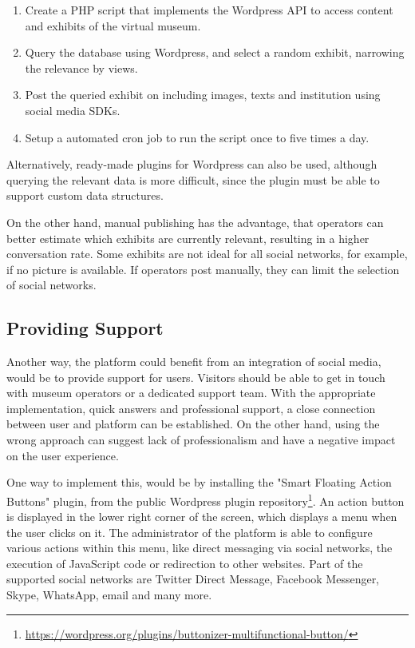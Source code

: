 \begin{enumerate}
    \item Create a PHP script that implements the Wordpress API to access content and exhibits of the virtual museum.
    \item Query the database using Wordpress, and select a random exhibit, narrowing the relevance by views.
    \item Post the queried exhibit on including images, texts and institution using social media SDKs.
    \item Setup a automated cron job to run the script once to five times a day.
\end{enumerate}

\noindent Alternatively, ready-made plugins for Wordpress can also be used, although querying the relevant data is more difficult, since the plugin must be able to support custom data structures. 

On the other hand, manual publishing has the advantage, that operators can better estimate which exhibits are currently relevant, resulting in a higher conversation rate. Some exhibits are not ideal for all social networks, for example, if no picture is available. If operators post manually, they can limit the selection of social networks.

\subsection{Providing Support} \label{social_support}

Another way, the platform could benefit from an integration of social media, would be to provide support for users. Visitors should be able to get in touch with museum operators or a dedicated support team. With the appropriate implementation, quick answers and professional support, a close connection between user and platform can be established. On the other hand, using the wrong approach can suggest lack of professionalism and have a negative impact on the user experience. 

One way to implement this, would be by installing the "Smart Floating Action Buttons" plugin, from the public Wordpress plugin repository\footnote{\url{https://wordpress.org/plugins/buttonizer-multifunctional-button/}}. An action button is displayed in the lower right corner of the screen, which displays a menu when the user clicks on it. The administrator of the platform is able to configure various actions within this menu, like direct messaging via social networks, the execution of JavaScript code or redirection to other websites. Part of the supported social networks are Twitter Direct Message, Facebook Messenger, Skype, WhatsApp, email and many more. 


